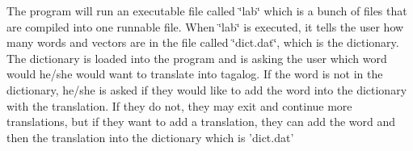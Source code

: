 The program will run an executable file called \char`\"{}lab\char`\"{} which is a bunch of files that are compiled into one runnable file. When \char`\"{}lab\char`\"{} is executed, it tells the user how many words and vectors are in the file called \char`\"{}dict.\+dat\char`\"{}, which is the dictionary. The dictionary is loaded into the program and is asking the user which word would he/she would want to translate into tagalog. If the word is not in the dictionary, he/she is asked if they would like to add the word into the dictionary with the translation. If they do not, they may exit and continue more translations, but if they want to add a translation, they can add the word and then the translation into the dictionary which is 'dict.\+dat' 